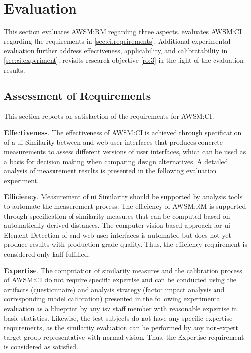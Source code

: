 \vspace{-15pt}
\hypertarget{sec:ci.evaluation}{%
\section{Evaluation}\label{sec:ci.evaluation}}
\vspace{15pt}

This section evaluates AWSM:RM regarding three aspects.
 evaluates AWSM:CI regarding the requirements in \cref{sec:ci.requirements}.
Additional experimental evaluation further address effectiveness, applicability, and calibratability in \cref{sec:ci.experiment}.
 revisits research objective \cref{ro:3} in the light of the evaluation results.

\vspace{-20pt}
\hypertarget{sec:ci.evaluation.req}{%
\subsection{Assessment of Requirements}\label{sec:ci.evaluation.req}}
\vspace{10pt}

This section reports on satisfaction of the requirements for AWSM:CI.

\textbf{Effectiveness}. The effectiveness of AWSM:CI is achieved through specification of a \gls{ui} Similarity between  and \gls{web} user interfaces that produces concrete measurements to assess different versions of user interfaces, which can be used as a basis for decision making when comparing design alternatives.
A detailed analysis of measurement results is presented in the following evaluation experiment.

\textbf{Efficiency}. Measurement of \gls{ui} Similarity should be supported by analysis tools to automate the measurement process.
The efficiency of AWSM:RM is supported through specification of similarity measures that can be computed based on automatically derived distances.
The computer-vision-based approach for \gls{ui} Element Detection of  and \gls{web} user interfaces is automated but does not yet produce results with production-grade quality.
Thus, the efficiency requirement is considered only half-fulfilled.

\textbf{Expertise}. The computation of similarity measures and the calibration process of AWSM:CI do not require specific expertise and can be conducted using the artifacts (questionnaire) and analysis strategy (factor impact analysis and corresponding model calibration) presented in the following experimental evaluation as a blueprint by any \gls{isv} staff member with reasonable expertise in basic statistics.
Likewise, the test subjects do not have any specific expertise requirements, as the similarity evaluation can be performed by any non-expert target group representative with normal vision.
Thus, the Expertise requirement is considered as satisfied.

